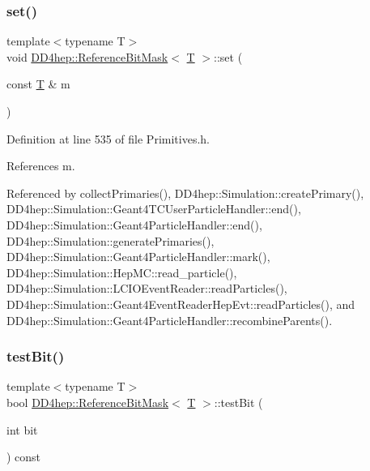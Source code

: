 \hypertarget{class_d_d4hep_1_1_reference_bit_mask_a9b0db38e1812101d6d93e1d00944b745}{}\label{class_d_d4hep_1_1_reference_bit_mask_a9b0db38e1812101d6d93e1d00944b745} 
\subsubsection{\texorpdfstring{set()}{set()}}
{\footnotesize\ttfamily template$<$typename T$>$ \\
void \hyperlink{class_d_d4hep_1_1_reference_bit_mask}{D\+D4hep\+::\+Reference\+Bit\+Mask}$<$ \hyperlink{class_t}{T} $>$\+::set (\begin{DoxyParamCaption}\item[{const \hyperlink{class_t}{T} \&}]{m }\end{DoxyParamCaption})\hspace{0.3cm}{\ttfamily [inline]}}



Definition at line 535 of file Primitives.\+h.



References m.



Referenced by collect\+Primaries(), D\+D4hep\+::\+Simulation\+::create\+Primary(), D\+D4hep\+::\+Simulation\+::\+Geant4\+T\+C\+User\+Particle\+Handler\+::end(), D\+D4hep\+::\+Simulation\+::\+Geant4\+Particle\+Handler\+::end(), D\+D4hep\+::\+Simulation\+::generate\+Primaries(), D\+D4hep\+::\+Simulation\+::\+Geant4\+Particle\+Handler\+::mark(), D\+D4hep\+::\+Simulation\+::\+Hep\+M\+C\+::read\+\_\+particle(), D\+D4hep\+::\+Simulation\+::\+L\+C\+I\+O\+Event\+Reader\+::read\+Particles(), D\+D4hep\+::\+Simulation\+::\+Geant4\+Event\+Reader\+Hep\+Evt\+::read\+Particles(), and D\+D4hep\+::\+Simulation\+::\+Geant4\+Particle\+Handler\+::recombine\+Parents().

\hypertarget{class_d_d4hep_1_1_reference_bit_mask_ae7e89ecd03fec8e012fa4c943a03be2d}{}\label{class_d_d4hep_1_1_reference_bit_mask_ae7e89ecd03fec8e012fa4c943a03be2d} 
\subsubsection{\texorpdfstring{test\+Bit()}{testBit()}}
{\footnotesize\ttfamily template$<$typename T$>$ \\
bool \hyperlink{class_d_d4hep_1_1_reference_bit_mask}{D\+D4hep\+::\+Reference\+Bit\+Mask}$<$ \hyperlink{class_t}{T} $>$\+::test\+Bit (\begin{DoxyParamCaption}\item[{int}]{bit }\end{DoxyParamCaption}) const\hspace{0.3cm}{\ttfamily [inline]}}



